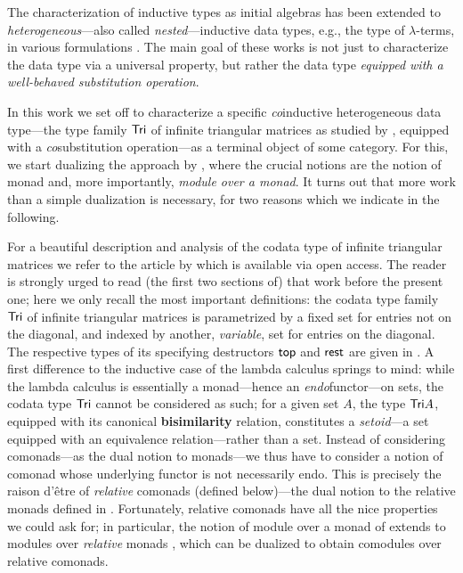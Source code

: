 \documentclass[conference,10pt]{IEEEtran}
\newcommand{\fat}[1]{\textbf{#1}}
\begin{document}
 
 The characterization of inductive types as initial algebras 
 has been extended to \emph{heterogeneous}---also called \emph{nested}---inductive data types, e.g., the type of $\lambda$-terms,
 in various formulations \parencite{fpt, DBLP:journals/iandc/HirschowitzM10}.
 The main goal of these works is not just to characterize the data type via a universal property, but rather the data type
 \emph{equipped with a well-behaved substitution operation}.
 
 

 In this work we set off to characterize a specific \emph{co}inductive heterogeneous data type---the type family $\mathsf{Tri}$ of 
 infinite triangular matrices as studied by \textcite{DBLP:conf/types/MatthesP11}, equipped with a \emph{co}substitution operation---as a terminal object of some 
 category. For this, we start dualizing the approach by \textcite{DBLP:journals/iandc/HirschowitzM10}, where 
 the crucial notions are the notion of monad and, more importantly, \emph{module over a monad}.
 It turns out that more work than a simple dualization is necessary, for two reasons which we indicate in the following.
 
  
 For a beautiful description and analysis of the codata type of infinite triangular matrices we refer to the article by
 \textcite{DBLP:conf/types/MatthesP11} which is available via open access. The reader is strongly urged to read (the first two sections of) that work 
 before the present one; here we only recall the most important
 definitions:
 the codata type family $\mathsf{Tri}$ of infinite triangular matrices is parametrized by a fixed set for entries not on the diagonal, 
 and indexed by another, \emph{variable}, set for entries on 
 the diagonal. The respective types of its specifying destructors $\mathsf{top}$ and $\mathsf{rest}$ are given in .
 A first difference to the inductive case of the lambda calculus springs to mind:
 while the lambda calculus is essentially a monad---hence an \emph{endo}functor---on sets, the codata type $\mathsf{Tri}$ cannot be considered as such;
 for a given set $A$, the type $\mathsf{Tri} A$, equipped with its canonical \fat{bisimilarity} relation, 
 constitutes a \emph{setoid}---a set equipped with an equivalence relation---rather than a set.
 Instead of considering comonads---as the dual notion to monads---we thus have to consider a notion of comonad whose underlying functor is not necessarily endo.
 This is precisely the raison d'\^etre of \emph{relative} comonads (defined below)---the dual notion to the relative monads defined in 
  \parencite{DBLP:conf/fossacs/AltenkirchCU10}. 
 Fortunately, relative comonads have all the nice properties we could ask for; 
 in particular, the notion of module over a monad of \parencite{DBLP:journals/iandc/HirschowitzM10} extends to modules over \emph{relative} monads
 \parencite{ahrens_relmonads}, which can be dualized to obtain comodules over relative comonads.
 
\end{document}
